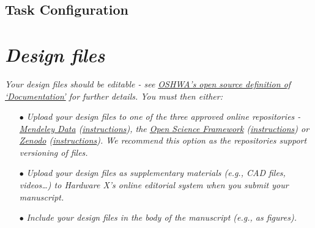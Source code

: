 \documentclass[11pt, letterpaper]{article}
\begin{document}
\subsection{Task Configuration}



\section*{\textit{Design files}}


\textit{Your design files should be editable - see \href{https://www.oshwa.org/definition/}{OSHWA’s open source definition of ‘Documentation’} for further details. You must then either:}
\begin{itemize}
\item[$\bullet$]{\it Upload your design files to one of the three approved online repositories - \href{https://data.mendeley.com/}{Mendeley Data} (\href{https://doi.org/10.5281/zenodo.3346799}{instructions}), the \href{https://osf.io/}{Open Science Framework} (\href{https://osf.io/wgk7q/wiki/home/}{instructions}) or \href{https://zenodo.org/}{Zenodo} (\href{https://doi.org/10.5281/zenodo.3346799}{instructions}). We recommend this option as the repositories support versioning of files.}
\item[$\bullet$]{\it Upload your design files as supplementary materials (e.g., CAD files, videos…) to Hardware X’s online editorial system when you submit your manuscript.}
\item[$\bullet$]{\it Include your design files in the body of the manuscript (e.g., as figures).}
\end{itemize}
\end{document}
